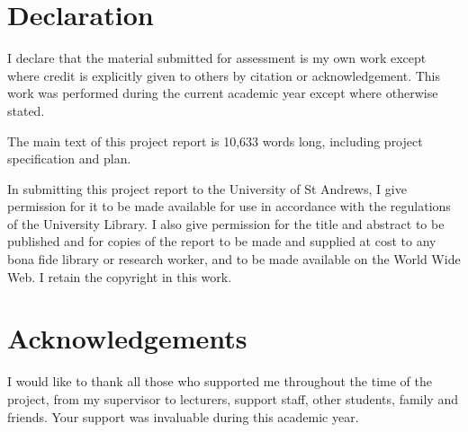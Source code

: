 

\section*{Declaration}
I declare that the material submitted for assessment is my own work except where credit is explicitly given to others by citation or acknowledgement. This work was performed during the current academic year except where otherwise stated.

The main text of this project report is 10,633 words long, including project specification and plan.

In submitting this project report to the University of St Andrews, I give permission for it to be made available for use in accordance with the regulations of the University Library. I also give permission for the title and abstract to be published and for copies of the report to be made and supplied at cost to any bona fide library or research worker, and to be made available on the World Wide Web. I retain the copyright in this work.

\section*{Acknowledgements}
I would like to thank all those who supported me throughout the time of the project, from my supervisor to lecturers, support staff, other students, family and friends. Your support was invaluable during this academic year.